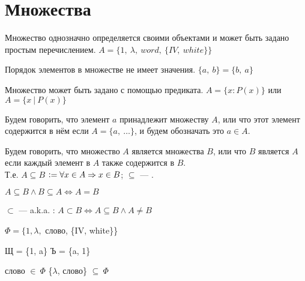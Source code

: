 \section{Множества}\label{sec:ch-1-sec-1}


\begin{definition}
    \begin{compactenum}
        \item Множество однозначно определяется своими объектами и может быть задано простым перечислением. $A = \{1,\ \lambda,\ word,\ \{IV,\ white\}\}$
        \item Порядок элементов в множестве не имеет значения. $\{a,\ b\} = \{b,\ a\}$
        \item Множество может быть задано с помощью предиката. $A = \{x : P(x)\}$ или $A = \{x\ |\ P(x)\}$
    \end{compactenum}
\end{definition}

Будем говорить, что элемент $a$ принадлежит множеству $A$,
или что этот элемент содержится в нём если $A = \{a,\ \ldots\}$, и будем обозначать это $a \in A$.

\begin{definition}
    Будем говорить, что множество $A$ является  множества $B$,
    или что $B$ является  $A$ если каждый элемент в $A$ также содержится в $B$.\\
    [1ex]
    Т.е. $A \subseteq B$ $\vcentcolon= \forall x \in A \Rightarrow x \in B$; $\subseteq$ --- .
\end{definition}

\begin{sh-proposition}
    $A \subseteq B \land B \subseteq A \Leftrightarrow A = B$
\end{sh-proposition}

\begin{definition}
    $\subset$ —  a.k.a. : $A \subset B \Leftrightarrow A \subseteq B \land A \neq B$
\end{definition}

\begin{examples}
    \begin{compactenum}
        \item $\Phi=\{1, \lambda, $ слово, \{IV, white\}\}
        \item Щ = \{1, a\} \quad Ъ = \{a, 1\}
        \item слово $\in ~\Phi$ \quad \{$\lambda$, слово\} $\subseteq ~\Phi$
    \end{compactenum}
\end{examples}

